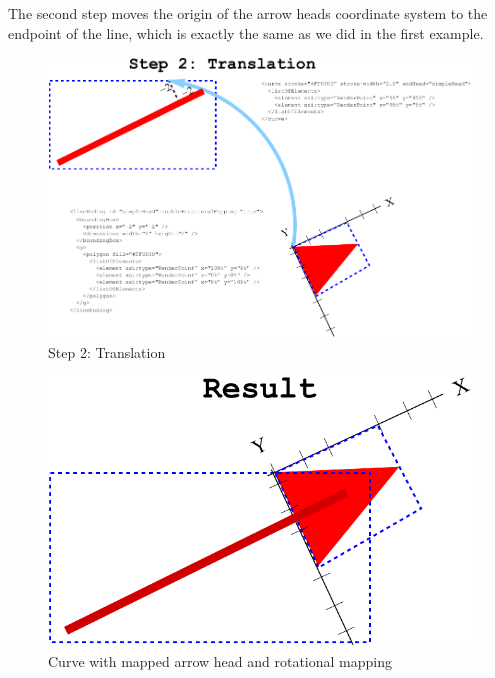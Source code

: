 The second step moves the origin of the arrow heads coordinate system to the endpoint of the line, which is exactly the same as we did in the first example.

\begin{figure}[!ht]
\begin{center}
\includegraphics[scale=0.25]{figures/ArrowHeadMapping4}
\end{center}
\caption{Step 2: Translation}
\label{ArrowHeadMapping4}
\end{figure}

\begin{figure}[!ht]
\begin{center}
\includegraphics[scale=0.25]{figures/ArrowHeadMapping5}
\end{center}
\caption{Curve with mapped arrow head and rotational mapping}
\label{ArrowHeadMapping5}
\end{figure}

